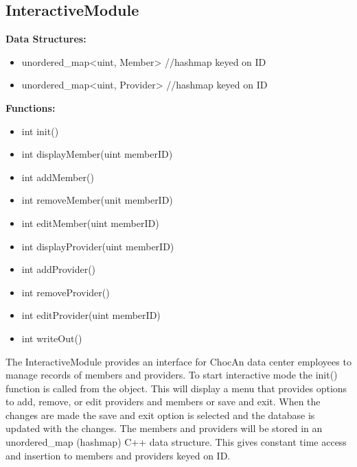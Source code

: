 \documentclass{article}
\begin{document}
\subsection{InteractiveModule}
\textbf{Data Structures:}
\begin{itemize}
   \item unordered_map<uint, Member>   //hashmap keyed on ID
   \item unordered_map<uint, Provider>   //hashmap keyed on ID
\end{itemize}
\textbf{Functions:}
\begin{itemize}
   \item int init()
   \item int displayMember(uint memberID)
   \item int addMember()
   \item int removeMember(unit memberID)
   \item int editMember(uint memberID)
   \item int displayProvider(uint memberID)
   \item int addProvider()
   \item int removeProvider()
   \item int editProvider(uint memberID)
   \item int writeOut()
\end{itemize}
The InteractiveModule provides an interface for ChocAn data center employees to manage records of members and providers. To start interactive mode the init() function is called from the object. This will display a menu that provides options to add, remove, or edit providers and members or save and exit. When the changes are made the save and exit option is selected and the database is updated with the changes. The members and providers will be stored in an unordered_map (hashmap) C++ data structure. This gives constant time access and insertion to members and providers keyed on ID.
\end{document}

